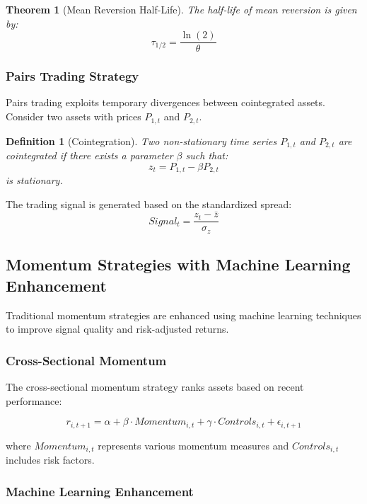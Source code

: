 \documentclass[12pt,a4paper]{article}
\newtheorem{theorem}{Theorem}
\newtheorem{definition}{Definition}
\begin{document}
\begin{theorem}[Mean Reversion Half-Life]
The half-life of mean reversion is given by:
$$\tau_{1/2} = \frac{\ln(2)}{\theta}$$
\end{theorem}

\subsubsection{Pairs Trading Strategy}

Pairs trading exploits temporary divergences between cointegrated assets. Consider two assets with prices $P_{1,t}$ and $P_{2,t}$.

\begin{definition}[Cointegration]
Two non-stationary time series $P_{1,t}$ and $P_{2,t}$ are cointegrated if there exists a parameter $\beta$ such that:
$$z_t = P_{1,t} - \beta P_{2,t}$$
is stationary.
\end{definition}

The trading signal is generated based on the standardized spread:
\begin{equation}
Signal_t = \frac{z_t - \bar{z}}{\sigma_z}
\end{equation}

\subsection{Momentum Strategies with Machine Learning Enhancement}

Traditional momentum strategies are enhanced using machine learning techniques to improve signal quality and risk-adjusted returns.

\subsubsection{Cross-Sectional Momentum}

The cross-sectional momentum strategy ranks assets based on recent performance:

\begin{equation}
r_{i,t+1} = \alpha + \beta \cdot Momentum_{i,t} + \gamma \cdot Controls_{i,t} + \epsilon_{i,t+1}
\end{equation}

where $Momentum_{i,t}$ represents various momentum measures and $Controls_{i,t}$ includes risk factors.

\subsubsection{Machine Learning Enhancement}
\end{document}
